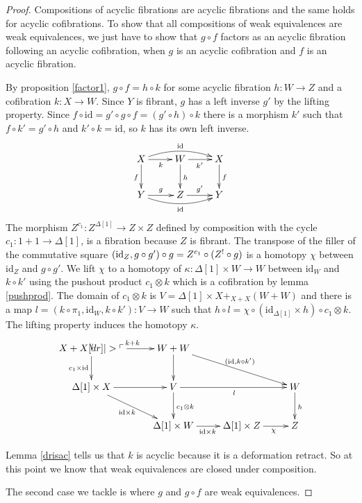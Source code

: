 \documentclass{amsart}
\theoremstyle{plain}
\theoremstyle{definition}
\newcommand\hide[1]{}
\newcommand\id{\mathrm{id}}
\begin{document}
\begin{proof}
Compositions of acyclic fibrations are acyclic fibrations and the same holds for acyclic cofibrations. To show that all compositions of weak equivalences are weak equivalences, we just have to show that $g\circ f$ factors as an acyclic fibration following an acyclic cofibration, when $g$ is an acyclic cofibration and $f$ is an acyclic fibration.

By proposition \ref{factor1}, $g\circ f=h\circ k$ for some acyclic fibration $h:W\to Z$ and a cofibration $k:X\to W$. Since $Y$ is fibrant, $g$ has a left inverse $g'$ by the lifting property. Since $f \circ \id = g'\circ g\circ f= (g'\circ h)\circ k$ there is a morphism $k'$ such that $f\circ k' = g'\circ h$ and $k'\circ k = \id$, so $k$ has its own left inverse.
\[\xymatrix{
X\ar[d]_f \ar[r]_{k} \ar@/^2ex/[rr]^{\id} & W\ar[d]^h \ar[r]_{k'} & X\ar[d]^f\\
Y \ar[r]^{g} \ar@/_2ex/[rr]_{\id} & Z \ar[r]^{g'} & Y
}\]
The morphism $Z^{c_1}:Z^{\Delta[1]}\to Z\times Z$ defined by composition with the cycle $c_1:1+1\to\Delta[1]$, is a fibration because $Z$ is fibrant. The transpose of the filler of the commutative square $(\id_Z,g\circ g')\circ g = Z^{c_1}\circ (Z^\bang\circ g)$ is a homotopy $\chi$ between $\id_Z$ and $g\circ g'$. We lift $\chi$ to a homotopy of $\kappa:\Delta[1]\times W\to W$ between $\id_W$ and $k\circ k'$ using the pushout product $c_1\otimes k$ which is a cofibration by lemma \ref{pushprod}. 
The domain of $c_1\otimes k$ is $V = \Delta[1]\times X +_{X+X} (W+W)$ and there is a map $l=(k\circ \pi_1,\id_W,k\circ k'): V\to W$ such that $h\circ l= \chi\circ (\id_{\Delta[1]}\times h)\circ c_1\otimes k$. The lifting property induces the homotopy $\kappa$.
\[\xymatrix{
X+X\ar[r]^{k+k} \ar[d]_{c_1\times \id} \po & W+W\ar[d] \ar[drr]^{(\id,k\circ k')} \\
\Delta[1]\times X \ar[r]\ar[dr]_{\id\times k} & V \ar[rr]_l\ar[d]^{c_1\otimes k} && W\ar[d]^h \\
& \Delta[1]\times W \ar[r]_{\id\times k} & \Delta[1]\times Z \ar[r]_(.6)\chi & Z
}\] %
\hide{overeenkomst: deformatie retract na acyclische fibratie is acyclische fibratie na acyclische cofibratie }

Lemma \ref{drisac} tells us that $k$ is acyclic because it is a deformation retract. So at this point we know that weak equivalences are closed under composition.

The second case we tackle is where $g$ and $g\circ f$ are weak equivalences. 


\end{proof}
\end{document}
